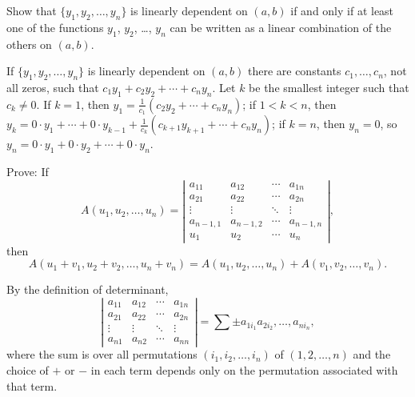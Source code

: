 \documentclass{ximera}
\begin{document}
\begin{problem}\label{exer:9.1.16}
Show that $\{y_1,y_2,\dots,y_n\}$ is linearly dependent on $(a,b)$ if
and only if at least one of the functions $y_1$, $y_2$, \dots, $y_n$ can be
written as a linear combination of the others on $(a,b)$.

\begin{solution}
If $\{y_1,y_2,\dots,y_n\}$ is linearly dependent on $(a,b)$
there are constants $c_1,\dots,c_n$, not all zeros, such that
$c_1y_1+c_2y_2+\cdots+c_ny_n$. Let $k$ be the smallest integer
such that $c_k\ne0$.  If $k=1$, then $y_1=\frac{1}{c_1}(c_2y_2+\cdots + c_ny_n)$; if $1<k<n$, then $y_k=0\cdot y_1+
\cdots+ 0\cdot y_{k-1}+\frac{1}{c_k}(c_{k+1}y_{k+1}+\cdots+c_ny_n)$;
 if $k=n$, then $y_n=0$, so $y_n=0\cdot y_1+0\cdot
y_2+\cdots+ 0\cdot y_n$.
\end{solution}
\end{problem}

\begin{problem}\label{exer:9.1.17}
Prove:  If
$$
A(u_1,u_2,\dots,u_n)=
\left|\begin{array}{cccc}
a_{11}&a_{12}&\cdots&a_{1n}\\ 
a_{21}&a_{22}&\cdots&a_{2n}\\ 
\vdots&\vdots&\ddots&\vdots\\ 
a_{n-1,1}&a_{n-1,2}&\cdots&a_{n-1,n}\\ 
u_1&u_2&\cdots&u_n\end{array}\right|,
$$
then
$$
A(u_1+v_1, u_2+v_2,\dots,
  u_n+v_n)=A(u_1,u_2,\dots,u_n)+A(v_1,v_2,\dots,
  v_n).
$$

\begin{hint}
By the definition of determinant,
$$
\left|\begin{array}{cccc}
a_{11}&a_{12}&\cdots&a_{1n}\\ 
a_{21}&a_{22}&\cdots&a_{2n}\\ 
\vdots&\vdots&\ddots&\vdots\\ 
a_{n1}&a_{n2}&\cdots&a_{nn}\end{array}\right|
=\sum\pm a_{1i_1}a_{2i_2},\dots,a_{ni_n},
$$
where the sum is over all permutations $(i_1,i_2,\dots,i_n)$ of
$(1,2,\dots, n)$ and the choice of $+$ or $-$ in each term depends
only on the permutation associated with that term.
\end{hint}
\end{problem}
\end{document}
